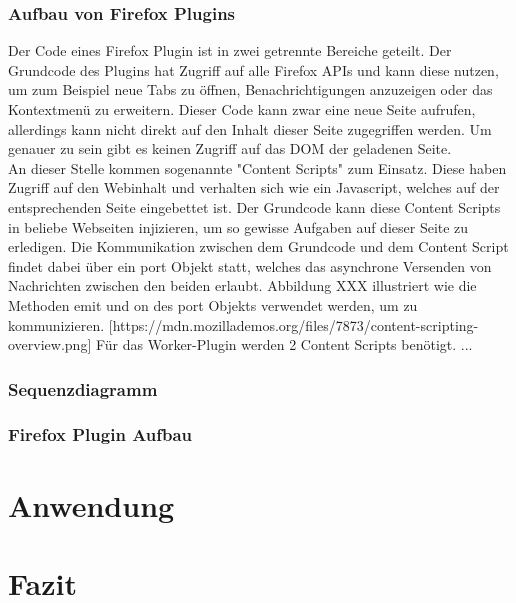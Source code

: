 \subsection{Aufbau von Firefox Plugins}
Der Code eines Firefox Plugin ist in zwei getrennte Bereiche geteilt. Der Grundcode des Plugins hat Zugriff auf alle Firefox APIs und kann diese nutzen, um zum Beispiel neue Tabs zu öffnen, Benachrichtigungen anzuzeigen oder das Kontextmenü zu erweitern. Dieser Code kann zwar eine neue Seite aufrufen, allerdings kann nicht direkt auf den Inhalt dieser Seite zugegriffen werden. Um genauer zu sein gibt es keinen Zugriff auf das DOM der geladenen Seite. \\
An dieser Stelle kommen sogenannte "Content Scripts" zum Einsatz. Diese haben Zugriff auf den Webinhalt und verhalten sich wie ein Javascript, welches auf der entsprechenden Seite eingebettet ist. Der Grundcode kann diese Content Scripts in beliebe Webseiten injizieren, um so gewisse Aufgaben auf dieser Seite zu erledigen. Die Kommunikation zwischen dem Grundcode und dem Content Script findet dabei über ein port Objekt statt, welches das asynchrone Versenden von Nachrichten zwischen den beiden erlaubt. Abbildung XXX illustriert wie die Methoden emit und on des port Objekts verwendet werden, um zu kommunizieren. [https://mdn.mozillademos.org/files/7873/content-scripting-overview.png]
Für das Worker-Plugin werden 2 Content Scripts benötigt. ...

\subsection{Sequenzdiagramm}
\subsection{Firefox Plugin Aufbau}
\chapter{Anwendung}
\chapter{Fazit}
